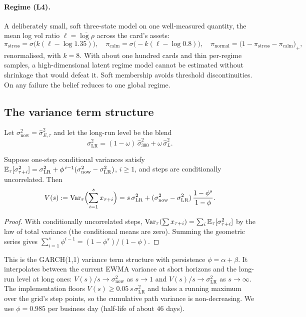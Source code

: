 \paragraph{Regime (L4).} A deliberately small, soft three-state model on one well-measured quantity, the mean log vol ratio
$\ell=\overline{\log\rho}$ across the card's assets:
\begin{equation}
  \pi_{\text{stress}}=\sigma\bigl(k(\ell-\log 1.35)\bigr),\quad \pi_{\text{calm}}=\sigma\bigl(-k(\ell-\log 0.8)\bigr),\quad
  \pi_{\text{normal}}=\bigl(1-\pi_{\text{stress}}-\pi_{\text{calm}}\bigr)_+ ,
\end{equation}
renormalised, with $k=8$. With about one hundred cards and thin per-regime samples, a high-dimensional latent regime model cannot be estimated
without shrinkage that would defeat it. Soft membership avoids threshold discontinuities. On any failure the belief reduces to one global regime.

\subsection{The variance term structure}

Let $\sigma^2_{\text{now}}=\hat\sigma^2_{E,\tau}$ and let the long-run level be the blend
\begin{equation}
  \sigma^2_{\mathrm{LR}} = (1-\omega)\,\hat\sigma^2_{300}+\omega\,\hat\sigma^2_{L}.
\end{equation}

\begin{proposition}\label{prop:agg}
Suppose one-step conditional variances satisfy $\mathbb{E}_\tau[\sigma^2_{\tau+i}]=\sigma^2_{\mathrm{LR}}+\phi^{\,i-1}(\sigma^2_{\text{now}}-\sigma^2_{\mathrm{LR}})$,
$i\ge1$, and steps are conditionally uncorrelated. Then
\begin{equation}\label{eq:agg}
  V(s) := \operatorname{Var}_\tau\Bigl(\sum_{i=1}^s x_{\tau+i}\Bigr) = s\,\sigma^2_{\mathrm{LR}} + (\sigma^2_{\text{now}}-\sigma^2_{\mathrm{LR}})\,\frac{1-\phi^s}{1-\phi}.
\end{equation}
\end{proposition}
\begin{proof}
With conditionally uncorrelated steps, $\operatorname{Var}_\tau(\sum x_{\tau+i})=\sum_i\mathbb{E}_\tau[\sigma^2_{\tau+i}]$ by the law of total variance (the conditional means
are zero). Summing the geometric series gives $\sum_{i=1}^s\phi^{i-1}=(1-\phi^s)/(1-\phi)$.
\end{proof}
This is the GARCH(1,1) variance term structure with persistence $\phi=\alpha+\beta$. It interpolates between the current EWMA variance at short
horizons and the long-run level at long ones: $V(s)/s\to\sigma^2_{\text{now}}$ as $s\to 1$ and $V(s)/s\to\sigma^2_{\mathrm{LR}}$ as $s\to\infty$. The
implementation floors $V(s)\ge0.05\,s\,\sigma^2_{\mathrm{LR}}$ and takes a running maximum over the grid's step points, so the cumulative path
variance is non-decreasing. We use $\phi=0.985$ per business day (half-life of about $46$ days).

